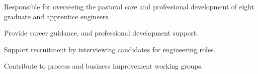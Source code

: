 Responsible for overseeing the pastoral care and professional development of eight graduate and apprentice engineers.
\vspace{0.25em}
\begin{tightemize}
  \item Provide career guidance, and professional development support.
  \item Support recruitment by interviewing candidates for engineering roles.
  \item Contribute to process and business improvement working groups.
\end{tightemize}
\sectionsep{}
